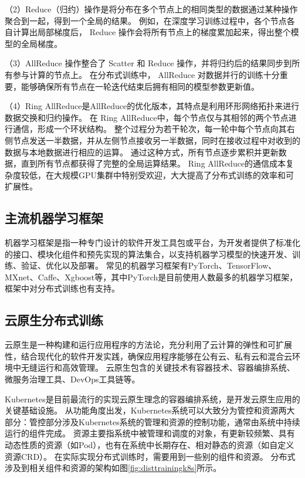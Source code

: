（2）Reduce（归约）操作是将分布在多个节点上的相同类型的数据通过某种操作聚合到一起，得到一个全局的结果。
例如，在深度学习训练过程中，各个节点各自计算出局部梯度后， Reduce 操作会将所有节点上的梯度累加起来，得出整个模型的全局梯度。

（3）AllReduce 操作整合了 Scatter 和 Reduce 操作，并将归约后的结果同步到所有参与计算的节点上。
在分布式训练中， AllReduce 对数据并行的训练十分重要，能够确保所有节点在一轮迭代结束后拥有相同的模型参数更新值。

（4）Ring AllReduce是AllReduce的优化版本，其特点是利用环形网络拓扑来进行数据交换和归约操作。
在 Ring AllReduce中，每个节点仅与其相邻的两个节点进行通信，形成一个环状结构。
整个过程分为若干轮次，每一轮中每个节点向其右侧节点发送一半数据，并从左侧节点接收另一半数据，同时在接收过程中对收到的数据与本地数据进行相应的运算。
通过这种方式，所有节点逐步累积并更新数据，直到所有节点都获得了完整的全局运算结果。
Ring AllReduce的通信成本复杂度较低，在大规模GPU集群中特别受欢迎，大大提高了分布式训练的效率和可扩展性。

\subsection{主流机器学习框架}

机器学习框架是指一种专门设计的软件开发工具包或平台，为开发者提供了标准化的接口、模块化组件和预先实现的算法集合，以支持机器学习模型的快速开发、训练、验证、优化以及部署。
常见的机器学习框架有PyTorch、TensorFlow、MXnet、Caffe、Xgboost等，其中PyTorch是目前使用人数最多的机器学习框架，框架中对分布式训练也有支持。

\subsection{云原生分布式训练}

云原生是一种构建和运行应用程序的方法论，充分利用了云计算的弹性和可扩展性，结合现代化的软件开发实践，确保应用程序能够在公有云、私有云和混合云环境中无缝运行和高效管理。
云原生包含的关键技术有容器技术、容器编排系统、微服务治理工具、DevOps工具链等。

Kubernetes是目前最流行的实现云原生理念的容器编排系统，是开发云原生应用的关键基础设施。
从功能角度出发，Kubernetes系统可以大致分为管控和资源两大部分：管控部分涉及Kubernetes系统的管理和资源的控制功能，通常由系统中持续运行的组件完成。
资源主要指系统中被管理和调度的对象，有更新较频繁、具有动态性质的资源（如Pod），也有在系统中长期存在、相对静态的资源（如自定义资源CRD）。
在实际实现分布式训练时，需要用到一些别的组件和资源。
分布式涉及到相关组件和资源的架构如图\ref{fig:disttrainingk8s}所示。

